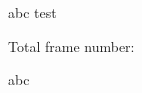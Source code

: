 \documentclass{xbeamer}
\begin{document}
\begin{frame}
  abc
  \pause
  test
\end{frame}

\begin{frame}
  Total frame number: 
\end{frame}

\begin{frame}
  abc
\end{frame}
\end{document}
